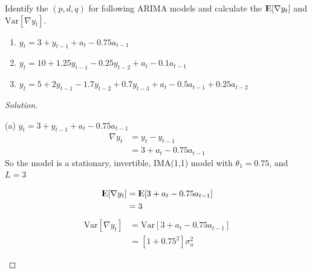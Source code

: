 \documentclass[UTF8,a4paper,14pt]{ctexart}
\newcommand{\E}{{\rm I\kern-.3em E}}
\newcommand{\Var}{\mathrm{Var}}
\newenvironment{solution}
  {\renewcommand\qedsymbol{$\blacksquare$}\begin{proof}[Solution]}
  {\end{proof}}
\theoremstyle{definition}
\theoremstyle{remark}
\begin{document}
\pagebreak
\begin{Problem}{}
  Identify the \((p, d, q)\) for following ARIMA models and calculate the \(\E[\nabla y_t]\) and \(\Var[\nabla y_t]\).
  \begin{enumerate}[label=(\alph*), ref=\alph*]
    \item \(y_t = 3+y_{t-1}+a_t-0.75a_{t-1}\)
    \item \(y_t = 10+1.25y_{t-1}-0.25y_{t-2}+a_t-0.1a_{t-1}\)
    \item \(y_t = 5+2y_{t-1}-1.7y_{t-2}+0.7y_{t-3}+a_t-0.5 a_{t-1}+0.25 a_{t-2}\)
  \end{enumerate}
\end{Problem}
\begin{solution}\,\\

  \begin{mybox}{(a) \(y_t = 3+y_{t-1}+a_t-0.75a_{t-1}\)}
    \begin{equation*}
      \begin{aligned}
        \nabla y_t 
        &= y_t-y_{t-1}\\
        &=3+a_t-0.75a_{t-1}
      \end{aligned}
    \end{equation*}
    So the model is a stationary, invertible, IMA(1,1) model with \( \theta_1 = 0.75\), and \(L=3\)


    \tcbsubtitle{\(\E[\nabla y_t ]\)}  
    \begin{equation*}
      \begin{aligned}
        \E[\nabla y_t] 
        &=\E[3+a_t-0.75a_{t-1}]\\
        &=3
      \end{aligned}
    \end{equation*}   
     \tcbsubtitle{\(\Var[\nabla y_t ]\)}  
    \begin{equation*}
      \begin{aligned}
        \Var[\nabla y_t ]
        &=\Var[3+a_t-0.75a_{t-1}]\\
        &=[1+0.75^2]\sigma_{a}^2
      \end{aligned}
    \end{equation*}
    

  \end{mybox}




\end{solution}
\end{document}
